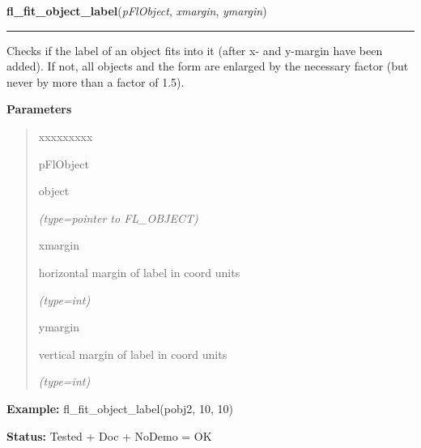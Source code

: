     \vspace{0.5ex}

\hspace{.8\funcindent}\begin{boxedminipage}{\funcwidth}

    \raggedright \textbf{fl\_fit\_object\_label}(\textit{pFlObject}, \textit{xmargin}, \textit{ymargin})

    \vspace{-1.5ex}

    \rule{\textwidth}{0.5\fboxrule}
\setlength{\parskip}{2ex}
    Checks if the label of an object fits into it (after x- and y-margin 
    have been added). If not, all objects and the form are enlarged by the 
    necessary factor (but never by more than a factor of 1.5).

\setlength{\parskip}{1ex}
      \textbf{Parameters}
      \vspace{-1ex}

      \begin{quote}
        \begin{Ventry}{xxxxxxxxx}

          \item[pFlObject]

          object

            {\it (type=pointer to FL\_OBJECT)}

          \item[xmargin]

          horizontal margin of label in coord units

            {\it (type=int)}

          \item[ymargin]

          vertical margin of label in coord units

            {\it (type=int)}

        \end{Ventry}

      \end{quote}

\textbf{Example:} fl\_fit\_object\_label(pobj2, 10, 10)



\textbf{Status:} Tested + Doc + NoDemo = OK



    \end{boxedminipage}

    \label{xformslib:flbasic:fl_get_object_geometry}

